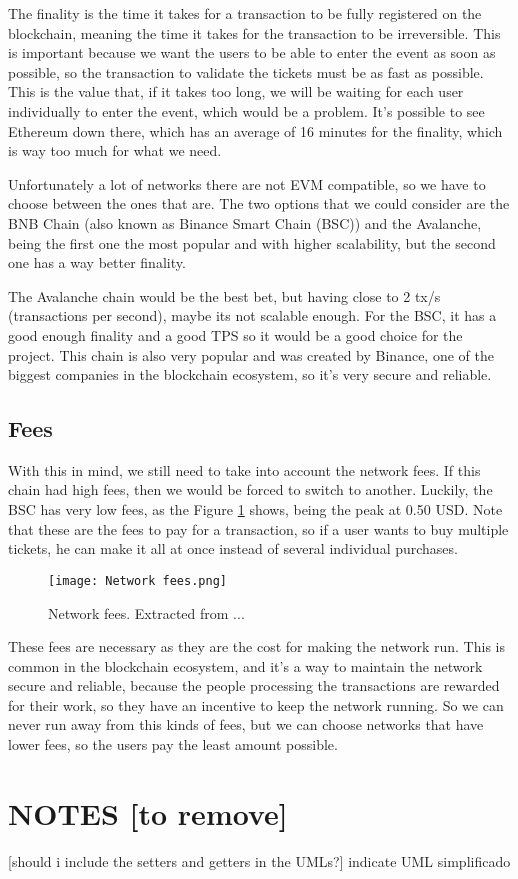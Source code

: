 The finality is the time it takes for a transaction to be fully registered on
the blockchain, meaning the time it takes for the transaction to be
irreversible. This is important because we want the users to be able to enter
the event as soon as possible, so the transaction to validate the tickets must
be as fast as possible. This is the value that, if it takes too long, we will
be waiting for each user individually to enter the event, which would be a
problem. It's possible to see Ethereum down there, which has an average of 16
minutes for the finality, which is way too much for what we need.

Unfortunately a lot of networks there are not EVM compatible, so we have to
choose between the ones that are. The two options that we could consider are
the BNB Chain (also known as Binance Smart Chain (BSC)) and the Avalanche,
being the first one the most popular and with higher scalability, but the
second one has a way better finality.

The Avalanche chain would be the best bet, but having close to 2 tx/s
(transactions per second), maybe its not scalable enough. For the BSC, it has a
good enough finality and a good TPS so it would be a good choice for the
project. This chain is also very popular and was created by Binance, one of the
biggest companies in the blockchain ecosystem, so it's very secure and
reliable.

\subsection{Fees}
\label{subsec:fees}

With this in mind, we still need to take into account the network fees. If this
chain had high fees, then we would be forced to switch to another. Luckily, the
BSC has very low fees, as the Figure \ref{fig:network_fees} shows, being the
peak at 0.50 USD. Note that these are the fees to pay for a transaction, so if
a user wants to buy multiple tickets, he can make it all at once instead of
several individual purchases.

\begin{figure}[H]
	\texttt{[image: Network fees.png]}
	\centering
	\caption{Network fees. Extracted from ...}
	\label{fig:network_fees}
\end{figure}

These fees are necessary as they are the cost for making the network run. This
is common in the blockchain ecosystem, and it's a way to maintain the network
secure and reliable, because the people processing the transactions are
rewarded for their work, so they have an incentive to keep the network running.
So we can never run away from this kinds of fees, but we can choose networks
that have lower fees, so the users pay the least amount possible.

\section{NOTES [to remove]}

 [should i include the setters and getters in the UMLs?] indicate UML simplificado
